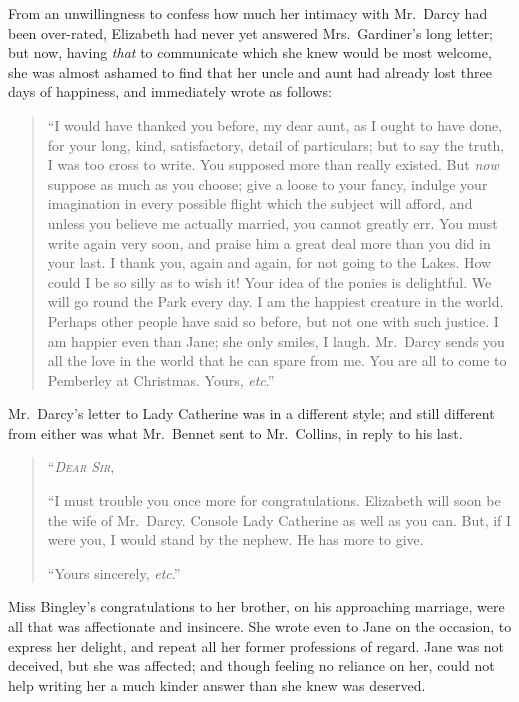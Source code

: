 \documentclass[12pt,english,oneside]{book}
\newcommand{\noun}[1]{\textsc{#1}}
\begin{document}
From an unwillingness to confess how much her intimacy with Mr.\ Darcy
had been over-rated, Elizabeth had never yet answered Mrs.\ Gardiner's
long letter; but now, having \textit{that} to communicate which she
knew would be most welcome, she was almost ashamed to find that her
uncle and aunt had already lost three days of happiness, and immediately
wrote as follows:

\begin{quotation}
{}``I would have thanked you before, my dear aunt, as I ought to
have done, for your long, kind, satisfactory, detail of particulars;
but to say the truth, I was too cross to write. You supposed more
than really existed. But \textit{now} suppose as much as you choose;
give a loose to your fancy, indulge your imagination in every possible
flight which the subject will afford, and unless you believe me actually
married, you cannot greatly err. You must write again very soon, and
praise him a great deal more than you did in your last. I thank you,
again and again, for not going to the Lakes. How could I be so silly
as to wish it! Your idea of the ponies is delightful. We will go round
the Park every day. I am the happiest creature in the world. Perhaps
other people have said so before, but not one with such justice. I
am happier even than Jane; she only smiles, I laugh. Mr.\ Darcy sends
you all the love in the world that he can spare from me. You are all
to come to Pemberley at Christmas. Yours, \textit{etc}.'' 
\end{quotation}
Mr.\ Darcy's letter to Lady Catherine was in a different style; and
still different from either was what Mr.\ Bennet sent to Mr.\ Collins,
in reply to his last.

\begin{quotation}
\noindent {}``\textit{\emph{\noun{Dear}}} \textit{\emph{\noun{Sir}}},\nopagebreak[4]

{}``I must trouble you once more for congratulations. Elizabeth will
soon be the wife of Mr.\ Darcy. Console Lady Catherine as well as
you can. But, if I were you, I would stand by the nephew. He has more
to give.

``Yours sincerely, \textit{etc}.'' 
\end{quotation}
Miss Bingley's congratulations to her brother, on his approaching
marriage, were all that was affectionate and insincere. She wrote
even to Jane on the occasion, to express her delight, and repeat all
her former professions of regard. Jane was not deceived, but she was
affected; and though feeling no reliance on her, could not help writing
her a much kinder answer than she knew was deserved.
\end{document}

